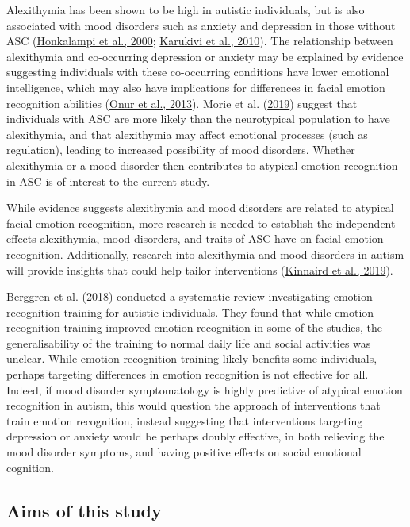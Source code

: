 \documentclass[
]{article}
\begin{document}
Alexithymia has been shown to be high in autistic individuals, but is also associated with mood disorders such as anxiety and depression in those without ASC (\protect\hyperlink{ref-honkalampi2000a}{Honkalampi et al., 2000}; \protect\hyperlink{ref-karukivi2010a}{Karukivi et al., 2010}). The relationship between alexithymia and co-occurring depression or anxiety may be explained by evidence suggesting individuals with these co-occurring conditions have lower emotional intelligence, which may also have implications for differences in facial emotion recognition abilities (\protect\hyperlink{ref-onur2013a}{Onur et al., 2013}). Morie et al. (\protect\hyperlink{ref-morie2019a}{2019}) suggest that individuals with ASC are more likely than the neurotypical population to have alexithymia, and that alexithymia may affect emotional processes (such as regulation), leading to increased possibility of mood disorders. Whether alexithymia or a mood disorder then contributes to atypical emotion recognition in ASC is of interest to the current study.

While evidence suggests alexithymia and mood disorders are related to atypical facial emotion recognition, more research is needed to establish the independent effects alexithymia, mood disorders, and traits of ASC have on facial emotion recognition. Additionally, research into alexithymia and mood disorders in autism will provide insights that could help tailor interventions (\protect\hyperlink{ref-kinnaird2019a}{Kinnaird et al., 2019}).

Berggren et al. (\protect\hyperlink{ref-berggren2018a}{2018}) conducted a systematic review investigating emotion recognition training for autistic individuals. They found that while emotion recognition training improved emotion recognition in some of the studies, the generalisability of the training to normal daily life and social activities was unclear. While emotion recognition training likely benefits some individuals, perhaps targeting differences in emotion recognition is not effective for all. Indeed, if mood disorder symptomatology is highly predictive of atypical emotion recognition in autism, this would question the approach of interventions that train emotion recognition, instead suggesting that interventions targeting depression or anxiety would be perhaps doubly effective, in both relieving the mood disorder symptoms, and having positive effects on social emotional cognition.

\hypertarget{aims-of-this-study}{%
\subsection*{Aims of this study}\label{aims-of-this-study}}
\end{document}
